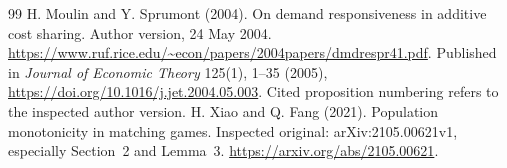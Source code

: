 \documentclass[11pt]{article}
\theoremstyle{definition}\newtheorem{definition}[theorem]{Definition}
\theoremstyle{remark}\newtheorem{remark}[theorem]{Remark}
\begin{document}
\begin{thebibliography}{99}
H. Moulin and Y. Sprumont (2004).
On demand responsiveness in additive cost sharing.
Author version, 24 May 2004.
\url{https://www.ruf.rice.edu/~econ/papers/2004papers/dmdrespr41.pdf}.
Published in \emph{Journal of Economic Theory} 125(1), 1--35 (2005),
\url{https://doi.org/10.1016/j.jet.2004.05.003}.
Cited proposition numbering refers to the inspected author version.
H. Xiao and Q. Fang (2021).
Population monotonicity in matching games.
Inspected original: arXiv:2105.00621v1, especially Section~2 and Lemma~3.
\url{https://arxiv.org/abs/2105.00621}.

\end{thebibliography}
\end{document}
